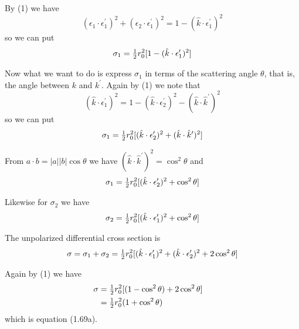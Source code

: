 \documentclass[12pt]{article}
\begin{document}
By (1) we have
\begin{equation*}
(\epsilon_1\cdot\epsilon_1^\prime)^2
+(\epsilon_2\cdot\epsilon_1^\prime)^2=1-(\hat k\cdot\epsilon_1^\prime)^2
\end{equation*}
so we can put
\begin{equation*}
\sigma_1=\hbox{$1\over2$}r_0^2[1-(\hat k\cdot\epsilon_1^\prime)^2]
\end{equation*}

Now what we want to do is express $\sigma_1$ in terms of the scattering angle
$\theta$, that is, the angle between $k$ and $k^\prime$.
Again by (1) we note that
\begin{equation*}
(\hat k\cdot\epsilon_1^\prime)^2=1-(\hat k\cdot\epsilon_2^\prime)^2
-(\hat k\cdot\hat k^\prime)^2
\end{equation*}
so we can put
$$\sigma_1=\hbox{$1\over2$}r_0^2[(\hat k\cdot\epsilon_2^\prime)^2
+(\hat k\cdot\hat k^\prime)^2]$$

From $a\cdot b=|a||b|\cos\theta$ we have $(\hat k\cdot\hat k^\prime)^2
=\cos^2\theta$ and
\begin{equation*}
\sigma_1=\hbox{$1\over2$}r_0^2[(\hat k\cdot\epsilon_2^\prime)^2
+\cos^2\theta]
\end{equation*}

Likewise for $\sigma_2$ we have
\begin{equation*}
\sigma_2=\hbox{$1\over2$}r_0^2[(\hat k\cdot\epsilon_1^\prime)^2+\cos^2\theta]
\end{equation*}

The unpolarized differential cross section is
\begin{equation*}
\sigma=\sigma_1+\sigma_2
=\hbox{$1\over2$}r_0^2[(\hat k\cdot\epsilon_1^\prime)^2
+(\hat k\cdot\epsilon_2^\prime)^2+2\cos^2\theta]
\end{equation*}

Again by (1) we have
\begin{align*}
\sigma&=\hbox{$1\over2$}r_0^2[(1-\cos^2\theta)+2\cos^2\theta]\cr
&=\hbox{$1\over2$}r_0^2(1+\cos^2\theta)
\end{align*}
which is equation (1.69a).
\end{document}
